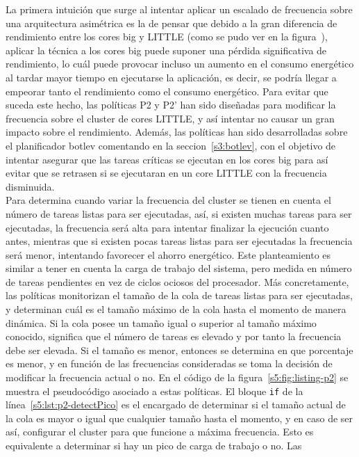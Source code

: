 La primera intuición que surge al intentar aplicar un escalado de
frecuencia sobre una arquitectura asimétrica es la de pensar que debido a
la gran diferencia de rendimiento entre los cores big y LITTLE (como se
pudo ver en la figura~), aplicar la técnica a los cores big puede
suponer una pérdida significativa de rendimiento, lo cuál puede provocar
incluso un aumento en el consumo energético al tardar mayor tiempo en
ejecutarse la aplicación, es decir, se podría llegar a empeorar tanto el
rendimiento como el consumo energético. Para evitar que suceda este hecho,
las políticas P2 y P2' han sido diseñadas para modificar la frecuencia
sobre el cluster de cores LITTLE, y así intentar no causar un gran impacto
sobre el rendimiento. Además, las políticas han sido desarrolladas sobre el
planificador botlev comentando en la seccion~\ref{s3:botlev}, con el
objetivo de intentar asegurar que las tareas críticas se ejecutan en los
cores big para así evitar que se retrasen si se ejecutaran en un core
LITTLE con la frecuencia disminuida.\\
Para determina cuando variar la frecuencia del cluster se tienen en cuenta
el número de tareas listas para ser ejecutadas, así, si existen muchas
tareas para ser ejecutadas, la frecuencia será alta para intentar finalizar
la ejecución cuanto antes, mientras que si existen pocas tareas listas para
ser ejecutadas la frecuencia será menor, intentando favorecer el ahorro
energético. Este planteamiento es similar a tener en cuenta la carga de
trabajo del sistema, pero medida en número de tareas pendientes en vez de
ciclos ociosos del procesador. Más concretamente, las políticas monitorizan
el tamaño de la cola de tareas listas para ser ejecutadas, y determinan
cuál es el tamaño máximo de la cola hasta el momento de manera dinámica. Si
la cola posee un tamaño igual o superior al tamaño máximo conocido,
significa que el número de tareas es elevado y por tanto la frecuencia debe
ser elevada. Si el tamaño es menor, entonces se determina en que porcentaje
es menor, y en función de las frecuencias consideradas se toma la decisión
de modificar la frecuencia actual o no. En el código de la
figura~\ref{s5:fig:listing-p2} se muestra el pseudocódigo asociado a estas
políticas. El bloque \texttt{if} de la línea~\ref{s5:lst:p2-detectPico} es
el encargado de determinar si el tamaño actual de la cola es mayor o igual
que cualquier tamaño hasta el momento, y en caso de ser así, configurar el
cluster para que funcione a máxima frecuencia. Esto es equivalente a
determinar si hay un pico de carga de trabajo o no. Las
